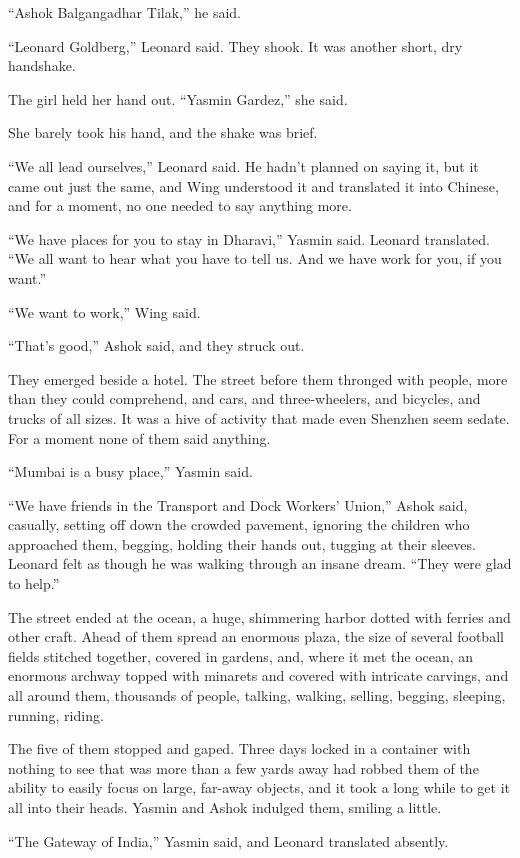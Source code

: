 ``Ashok Balgangadhar Tilak,'' he said.

``Leonard Goldberg,'' Leonard said. They shook. It was another short,
dry handshake.

The girl held her hand out. ``Yasmin Gardez,'' she said.

She barely took his hand, and the shake was brief.

``We all lead ourselves,'' Leonard said. He hadn't planned on saying
it, but it came out just the same, and Wing understood it and
translated it into Chinese, and for a moment, no one needed to say
anything more.

``We have places for you to stay in Dharavi,'' Yasmin said. Leonard
translated. ``We all want to hear what you have to tell us. And we
have work for you, if you want.''

``We want to work,'' Wing said.

``That's good,'' Ashok said, and they struck out.

They emerged beside a hotel. The street before them thronged with
people, more than they could comprehend, and cars, and
three-wheelers, and bicycles, and trucks of all sizes. It was a
hive of activity that made even Shenzhen seem sedate. For a moment
none of them said anything.

``Mumbai is a busy place,'' Yasmin said.

``We have friends in the Transport and Dock Workers' Union,'' Ashok
said, casually, setting off down the crowded pavement, ignoring the
children who approached them, begging, holding their hands out,
tugging at their sleeves. Leonard felt as though he was walking
through an insane dream. ``They were glad to help.''

The street ended at the ocean, a huge, shimmering harbor dotted
with ferries and other craft. Ahead of them spread an enormous
plaza, the size of several football fields stitched together,
covered in gardens, and, where it met the ocean, an enormous
archway topped with minarets and covered with intricate carvings,
and all around them, thousands of people, talking, walking,
selling, begging, sleeping, running, riding.

The five of them stopped and gaped. Three days locked in a
container with nothing to see that was more than a few yards away
had robbed them of the ability to easily focus on large, far-away
objects, and it took a long while to get it all into their heads.
Yasmin and Ashok indulged them, smiling a little.

``The Gateway of India,'' Yasmin said, and Leonard translated
absently.

